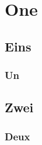 \documentclass[
11pt,		
paper=a4,	
ngerman,	
BCOR=0pt,	
DIV=calc,	
headinclude,	
headsepline,	
]{scrreprt}
\begin{document}
\renewcommand*\thesubsection{\alph{subsection}}

\tableofcontents

\chapter{One}

\section{Eins}

\subsection{Un}

\section{Zwei}

\subsection{Deux}
\end{document}
